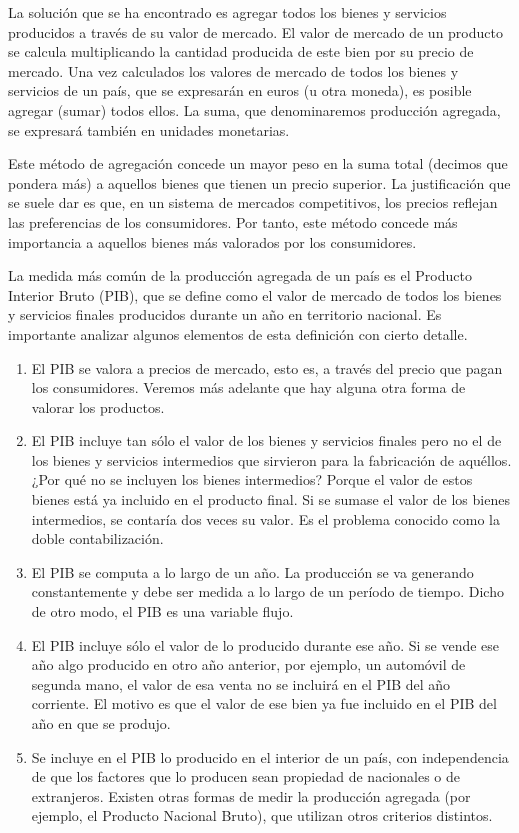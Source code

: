\documentclass[
]{krantz}
\providecommand{\tightlist}{%
  \setlength{\itemsep}{0pt}\setlength{\parskip}{0pt}}
\begin{document}
La solución que se ha encontrado es agregar todos los bienes y servicios producidos a través de su valor de mercado. El valor de mercado de un producto se calcula multiplicando la cantidad producida de este bien por su precio de mercado. Una vez calculados los valores de mercado de todos los bienes y servicios de un país, que se expresarán en euros (u otra moneda), es posible agregar (sumar) todos ellos. La suma, que denominaremos producción agregada, se expresará también en unidades monetarias.

Este método de agregación concede un mayor peso en la suma total (decimos que pondera más) a aquellos bienes que tienen un precio superior. La justificación que se suele dar es que, en un sistema de mercados competitivos, los precios reflejan las preferencias de los consumidores. Por tanto, este método concede más importancia a aquellos bienes más valorados por los consumidores.

La medida más común de la producción agregada de un país es el Producto Interior Bruto (PIB), que se define como el valor de mercado de todos los bienes y servicios finales producidos durante un año en territorio nacional. Es importante analizar algunos elementos de esta definición con cierto detalle.

\begin{enumerate}
\def\labelenumi{\alph{enumi})}
\tightlist
\item
  El PIB se valora a precios de mercado, esto es, a través del precio que pagan los consumidores. Veremos más adelante que hay alguna otra forma de valorar los productos.
\item
  El PIB incluye tan sólo el valor de los bienes y servicios finales pero no el de los bienes y servicios intermedios que sirvieron para la fabricación de aquéllos. ¿Por qué no se incluyen los bienes intermedios? Porque el valor de estos bienes está ya incluido en el producto final. Si se sumase el valor de los bienes intermedios, se contaría dos veces su valor. Es el problema conocido como la doble contabilización.
\item
  El PIB se computa a lo largo de un año. La producción se va generando constantemente y debe ser medida a lo largo de un período de tiempo. Dicho de otro modo, el PIB es una variable flujo.
\item
  El PIB incluye sólo el valor de lo producido durante ese año. Si se vende ese año algo producido en otro año anterior, por ejemplo, un automóvil de segunda mano, el valor de esa venta no se incluirá en el PIB del año corriente. El motivo es que el valor de ese bien ya fue incluido en el PIB del año en que se produjo.
\item
  Se incluye en el PIB lo producido en el interior de un país, con independencia de que los factores que lo producen sean propiedad de nacionales o de extranjeros. Existen otras formas de medir la producción agregada (por ejemplo, el Producto Nacional Bruto), que utilizan otros criterios distintos.
\end{enumerate}
\end{document}
